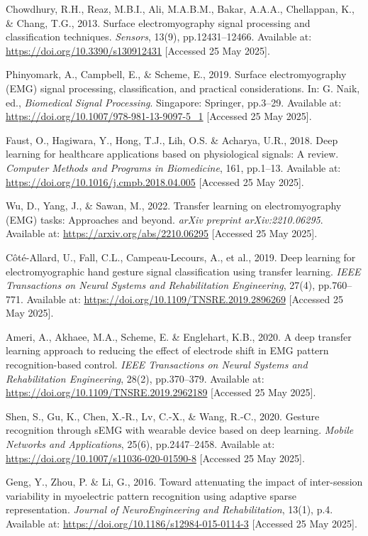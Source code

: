 \begin{multicols}{2}
\begin{thebibliography}{99}
Chowdhury, R.H., Reaz, M.B.I., Ali, M.A.B.M., Bakar, A.A.A., Chellappan, K., \& Chang, T.G., 2013. Surface electromyography signal processing and classification techniques. \textit{Sensors}, 13(9), pp.12431–12466. Available at: \url{https://doi.org/10.3390/s130912431} [Accessed 25 May 2025].

Phinyomark, A., Campbell, E., \& Scheme, E., 2019. Surface electromyography (EMG) signal processing, classification, and practical considerations. In: G. Naik, ed., \textit{Biomedical Signal Processing}. Singapore: Springer, pp.3–29. Available at: \url{https://doi.org/10.1007/978-981-13-9097-5_1} [Accessed 25 May 2025].

Faust, O., Hagiwara, Y., Hong, T.J., Lih, O.S. \& Acharya, U.R., 2018. Deep learning for healthcare applications based on physiological signals: A review. \textit{Computer Methods and Programs in Biomedicine}, 161, pp.1–13. Available at: \url{https://doi.org/10.1016/j.cmpb.2018.04.005} [Accessed 25 May 2025].

Wu, D., Yang, J., \& Sawan, M., 2022. Transfer learning on electromyography (EMG) tasks: Approaches and beyond. \textit{arXiv preprint arXiv:2210.06295}. Available at: \url{https://arxiv.org/abs/2210.06295} [Accessed 25 May 2025].

Côté-Allard, U., Fall, C.L., Campeau-Lecours, A., et al., 2019. Deep learning for electromyographic hand gesture signal classification using transfer learning. \textit{IEEE Transactions on Neural Systems and Rehabilitation Engineering}, 27(4), pp.760–771. Available at: \url{https://doi.org/10.1109/TNSRE.2019.2896269} [Accessed 25 May 2025].

Ameri, A., Akhaee, M.A., Scheme, E. \& Englehart, K.B., 2020. A deep transfer learning approach to reducing the effect of electrode shift in EMG pattern recognition-based control. \textit{IEEE Transactions on Neural Systems and Rehabilitation Engineering}, 28(2), pp.370–379. Available at: \url{https://doi.org/10.1109/TNSRE.2019.2962189} [Accessed 25 May 2025].

Shen, S., Gu, K., Chen, X.-R., Lv, C.-X., \& Wang, R.-C., 2020. Gesture recognition through sEMG with wearable device based on deep learning. \textit{Mobile Networks and Applications}, 25(6), pp.2447–2458. Available at: \url{https://doi.org/10.1007/s11036-020-01590-8} [Accessed 25 May 2025].

Geng, Y., Zhou, P. \& Li, G., 2016. Toward attenuating the impact of inter-session variability in myoelectric pattern recognition using adaptive sparse representation. \textit{Journal of NeuroEngineering and Rehabilitation}, 13(1), p.4. Available at: \url{https://doi.org/10.1186/s12984-015-0114-3} [Accessed 25 May 2025].


\end{thebibliography}
\end{multicols}
